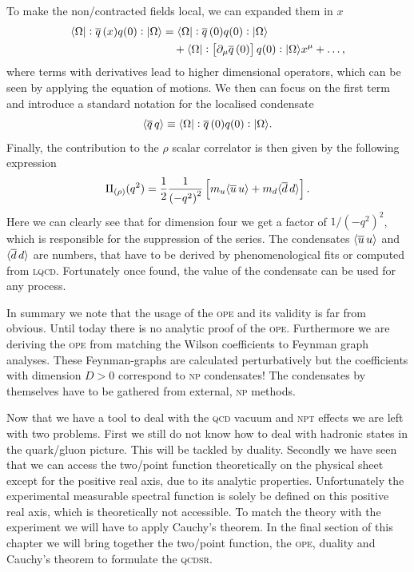 \documentclass[../../index.tex]{subfiles}
\begin{document}
To make the non\-/contracted fields local, we can expanded them in \(x\)
\begin{equation}
  \begin{split}
    \langle \Omega \vert: \overline{q}\,(x) q(0):\vert \Omega \rangle &= \langle\Omega\vert: \overline{q}\,(0) q(0): \vert\Omega\rangle\\
    &\quad+ \langle\Omega\vert:\left[ \partial_\mu \overline{q}\,(0) \right]
    q(0):\vert\Omega\rangle x^\mu + \dots,
  \end{split}
\end{equation}
where terms with derivatives lead to higher dimensional operators, which can be
seen by applying the equation of motions. We then can focus on
the first term and introduce a standard notation for the localised condensate
\begin{equation}
  \langle \overline{q}\,q \rangle \equiv \langle\Omega\vert: \overline{q}\,(0) q(0):\vert\Omega\rangle.
\end{equation}
Finally, the contribution to the \(\rho\) scalar correlator is then given by the
following expression
\begin{equation}
  \Pi_{(\rho)}(q^2) = \frac{1}{2} \frac{1}{\left(-q^2\right)^2}
  \left[ m_u\langle \overline{u}\, u \rangle + m_d \langle \overline{d}\, d \rangle\right].
\end{equation}
Here we can clearly see that for dimension four we get a factor of
\(1/(-q^2)^2\), which is responsible for the suppression of the series. The
condensates \(\langle\overline{u}\,u\rangle\) and \(\langle\overline{d}\,d\rangle\) are
numbers, that have to be derived by phenomenological fits or computed from
\textsc{lqcd}. Fortunately once found, the value of the condensate can be used
for any process.

In summary we note that the usage of the \textsc{ope} and its validity is far
from obvious. Until today there is no analytic proof of the \textsc{ope}.
Furthermore we are deriving the \textsc{ope} from matching the Wilson
coefficients to Feynman graph analyses. These Feynman-graphs are calculated
perturbatively but the coefficients with dimension $D>0$ correspond to
\textsc{np} condensates! The condensates by themselves have to be gathered from
external, \textsc{np} methods.

Now that we have a tool to deal with the \textsc{qcd} vacuum and \textsc{npt}
effects we are left with two problems. First we still do not know how to deal
with hadronic states in the quark\-/gluon picture. This will be tackled by
duality. Secondly we have seen that we can access the two\-/point function
theoretically on the physical sheet except for the positive real axis, due to
its analytic properties. Unfortunately the experimental measurable spectral
function is solely be defined on this positive real axis, which is theoretically
not accessible. To match the theory with the experiment we will have to apply
Cauchy's theorem. In the final section of this chapter we will bring together
the two\-/point function, the \textsc{ope}, duality and Cauchy's theorem to
formulate the \textsc{qcdsr}.
\end{document}
